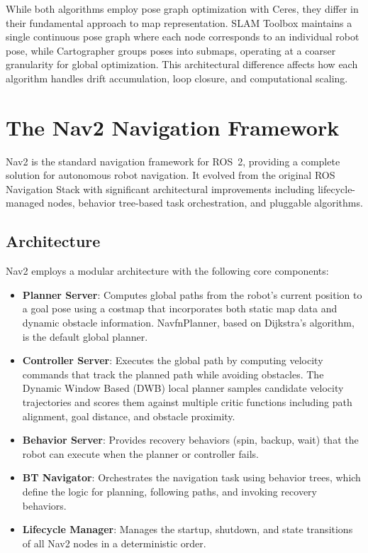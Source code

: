 While both algorithms employ pose graph optimization with Ceres, they differ in their fundamental approach to map representation. SLAM Toolbox maintains a single continuous pose graph where each node corresponds to an individual robot pose, while Cartographer groups poses into submaps, operating at a coarser granularity for global optimization. This architectural difference affects how each algorithm handles drift accumulation, loop closure, and computational scaling.

\section{The Nav2 Navigation Framework}

Nav2 \citep{macenski2020nav2} is the standard navigation framework for ROS~2, providing a complete solution for autonomous robot navigation. It evolved from the original ROS Navigation Stack with significant architectural improvements including lifecycle-managed nodes, behavior tree-based task orchestration, and pluggable algorithms.

\subsection{Architecture}

Nav2 employs a modular architecture with the following core components:

\begin{itemize}
\item \textbf{Planner Server}: Computes global paths from the robot's current position to a goal pose using a costmap that incorporates both static map data and dynamic obstacle information. NavfnPlanner, based on Dijkstra's algorithm, is the default global planner.

\item \textbf{Controller Server}: Executes the global path by computing velocity commands that track the planned path while avoiding obstacles. The Dynamic Window Based (DWB) local planner samples candidate velocity trajectories and scores them against multiple critic functions including path alignment, goal distance, and obstacle proximity.

\item \textbf{Behavior Server}: Provides recovery behaviors (spin, backup, wait) that the robot can execute when the planner or controller fails.

\item \textbf{BT Navigator}: Orchestrates the navigation task using behavior trees, which define the logic for planning, following paths, and invoking recovery behaviors.

\item \textbf{Lifecycle Manager}: Manages the startup, shutdown, and state transitions of all Nav2 nodes in a deterministic order.
\end{itemize}

